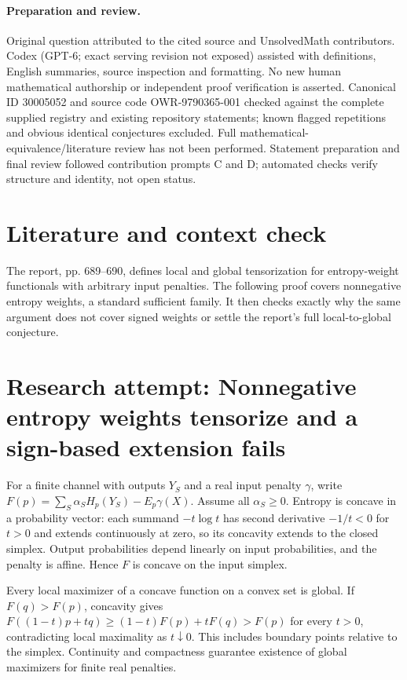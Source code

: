 \documentclass[11pt]{article}
\begin{document}
\paragraph{Preparation and review.}
Original question attributed to the cited source and UnsolvedMath contributors. Codex (GPT-6; exact serving revision not exposed) assisted with definitions, English summaries, source inspection and formatting. No new human mathematical authorship or independent proof verification is asserted. Canonical ID 30005052 and source code OWR-9790365-001 checked against the complete supplied registry and existing repository statements; known flagged repetitions and obvious identical conjectures excluded. Full mathematical-equivalence/literature review has not been performed. Statement preparation and final review followed contribution prompts C and D; automated checks verify structure and identity, not open status.
\label{end:30005052}

\section{Literature and context check}
The report, pp. 689--690, defines local and global tensorization for entropy-weight functionals with arbitrary input penalties. The following proof covers nonnegative entropy weights, a standard sufficient family. It then checks exactly why the same argument does not cover signed weights or settle the report's full local-to-global conjecture.
\section{Research attempt: Nonnegative entropy weights tensorize and a sign-based extension fails}
For a finite channel with outputs $Y_S$ and a real input penalty $\gamma$, write $F(p)=\sum_S\alpha_SH_p(Y_S)-E_p\gamma(X)$. Assume all $\alpha_S\ge0$. Entropy is concave in a probability vector: each summand $-t\log t$ has second derivative $-1/t<0$ for $t>0$ and extends continuously at zero, so its concavity extends to the closed simplex. Output probabilities depend linearly on input probabilities, and the penalty is affine. Hence $F$ is concave on the input simplex.

Every local maximizer of a concave function on a convex set is global. If $F(q)>F(p)$, concavity gives $F((1-t)p+tq)\ge(1-t)F(p)+tF(q)>F(p)$ for every $t>0$, contradicting local maximality as $t\downarrow0$. This includes boundary points relative to the simplex. Continuity and compactness guarantee existence of global maximizers for finite real penalties.
\end{document}
